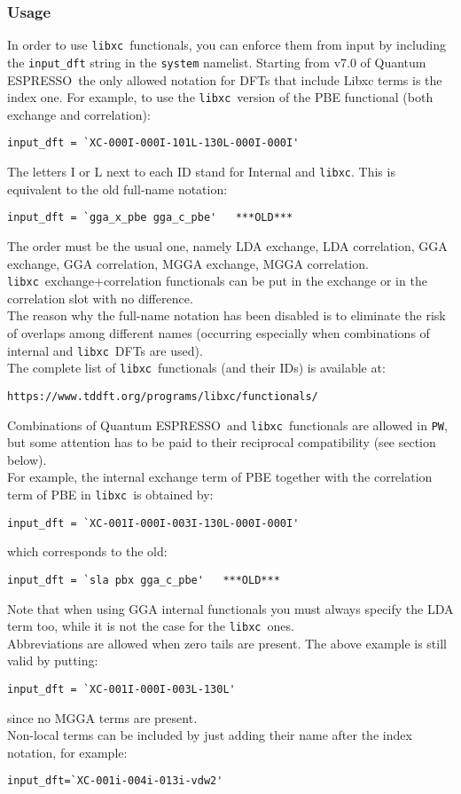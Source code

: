 \documentclass[12pt,a4paper]{article}
\def\qe{{\sc Quantum ESPRESSO}}
\def\libxc{\texttt{libxc}}
\begin{document}
\subsubsection{Usage}
In order to use \libxc\ functionals, you can enforce them from input by including the \texttt{input\_dft} string in the \texttt{system} namelist. Starting from v7.0 of \qe\ the only allowed notation for DFTs that include Libxc terms is the index one. For example, to use the \libxc\ version of the PBE functional (both exchange and correlation):
\begin{verbatim}
input_dft = `XC-000I-000I-101L-130L-000I-000I'
\end{verbatim}
The letters I or L next to each ID stand for Internal and \libxc. This is equivalent to the old full-name notation:
\begin{verbatim}
input_dft = `gga_x_pbe gga_c_pbe'   ***OLD***
\end{verbatim}
The order must be the usual one, namely LDA exchange, LDA correlation, GGA exchange, GGA correlation, MGGA exchange, MGGA correlation. \libxc\ exchange+correlation functionals can be put in the exchange or in the correlation slot with no difference.\\
The reason why the full-name notation has been disabled is to eliminate the risk of overlaps among different names (occurring especially when combinations of internal and \libxc\ DFTs are used).\\
%
The complete list of \libxc\ functionals (and their IDs) is available at:
\begin{verbatim}
https://www.tddft.org/programs/libxc/functionals/
\end{verbatim}
%
Combinations of \qe\ and \libxc\ functionals are allowed in \texttt{PW}, but some attention has to be paid to their reciprocal compatibility (see section below).\\
For example, the internal exchange term of PBE together with the correlation term of PBE in \libxc\ is obtained by:
\begin{verbatim}
input_dft = `XC-001I-000I-003I-130L-000I-000I'
\end{verbatim}
which corresponds to the old:
\begin{verbatim}
input_dft = `sla pbx gga_c_pbe'   ***OLD***
\end{verbatim}
Note that when using GGA internal functionals you must always specify the LDA term too, while it is not the case for the \libxc\ ones.\\
Abbreviations are allowed when zero tails are present. The above example is still valid by putting:
\begin{verbatim}
input_dft = `XC-001I-000I-003L-130L'
\end{verbatim}
since no MGGA terms are present.\\
Non-local terms can be included by just adding their name after the index notation, for example:
\begin{verbatim}
input_dft=`XC-001i-004i-013i-vdw2'
\end{verbatim}
%
\end{document}
